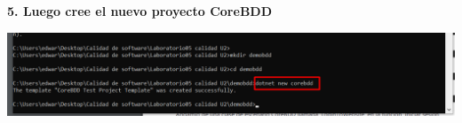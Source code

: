 \documentclass{article}
\begin{document}
	\textbf{5. Luego cree el nuevo proyecto CoreBDD
}

    \begin{center}
		\includegraphics[width=15cm]{./images/5} 
	\end{center}
\end{document}
